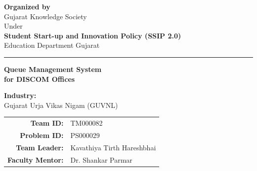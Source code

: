 \documentclass[12pt,a4paper]{report}
\begin{document}
\begin{titlepage}
    \centering
    
    \vspace*{1cm}
    
    
    \vspace{1.5cm}
    
    {\Large\textbf{Organized by}}\\[0.5cm]
    {\large Gujarat Knowledge Society}\\[0.2cm]
    {\normalsize Under}\\[0.2cm]
    {\large\textbf{Student Start-up and Innovation Policy (SSIP 2.0)}}\\[0.2cm]
    {\large Education Department Gujarat}
    
    \vspace{2cm}
    
    \textcolor{primaryblue}{\rule{0.8\textwidth}{2pt}}
    
    \vspace{1.5cm}
    
    {\LARGE\textbf{Queue Management System}}\\[0.3cm]
    {\Large\textbf{for DISCOM Offices}}\\[0.5cm]
    
    \vspace{0.5cm}
    
    {\large\textbf{Industry:}}\\[0.2cm]
    {\large Gujarat Urja Vikas Nigam (GUVNL)}
    
    \vspace{1cm}
    
    \begin{tabular}{rl}
        \textbf{Team ID:} & TM000082 \\[0.2cm]
        \textbf{Problem ID:} & PS000029 \\[0.2cm]
        \textbf{Team Leader:} & Kavathiya Tirth Hareshbhai \\[0.2cm]
        \textbf{Faculty Mentor:} & Dr. Shankar Parmar \\
    \end{tabular}
    

\end{titlepage}
\end{document}
